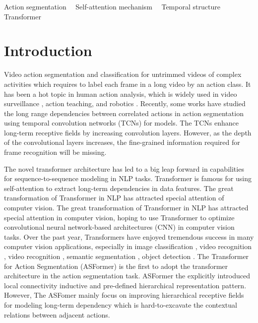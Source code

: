 \documentclass[runningheads]{llncs}
\begin{document}
\begin{keywords}
	Action segmentation~~ Self-attention mechanism~~ Temporal structure~~ Transformer
\end{keywords}



\section{Introduction}\label{Indro}

\par{
	Video action segmentation and classification for untrimmed videos of complex activities which requires to label each frame in a long video by an action class. It has been a hot topic in human action analysis, which is widely used in video surveillance \cite{collins2000introduction}, action teaching, and robotics \cite{vo2014stochastic}.
	Recently, some works \cite{lea2017temporal,farha2019ms,fayyaz2020sct,wang2020gated,li2021efficient} have studied the long range dependencies between correlated actions in action segmentation using temporal convolution networks (TCNs) for models. The TCNs enhance long-term receptive fields by increasing convolution layers. However, as the depth of the convolutional layers increases, the fine-grained information required for frame recognition will be missing. 
}
\par{
	The novel transformer architecture \cite{vaswani2017attention} has led to a big leap forward in capabilities for sequence-to-sequence modeling in NLP tasks. Transformer is famous for using self-attention to extract long-term dependencies in data features. The great transformation of Transformer in NLP has attracted special attention of computer vision. The great transformation of Transformer in NLP has attracted special attention in computer vision, hoping to use Transformer to optimize convolutional neural network-based architectures (CNN) in computer vision tasks. Over the past year, Transformers have enjoyed tremendous success in many computer vision applications, especially in image classification \cite{chen2021crossvit,dosovitskiy2020image,wang2021pyramid,liu2021swin,touvron2021training,liu2022transformer}, video recognition \cite{arnab2021vivit,li2021trear}, video recognition \cite{strudel2021segmenter,zheng2021rethinking}, semantic segmentation \cite{strudel2021segmenter,zheng2021rethinking}, object detection \cite{yi2021asformer}. The Transformer for Action Segmentation (ASFormer) is the first to adopt the transformer architecture in the action segmentation task. ASFormer the explicitly introduced local connectivity inductive and pre-defined hierarchical representation pattern. However, The ASFomer mainly focus on improving hierarchical receptive fields for modeling long-term dependency which is hard-to-excavate the contextual relations between adjacent actions.	
} 
\end{document}
